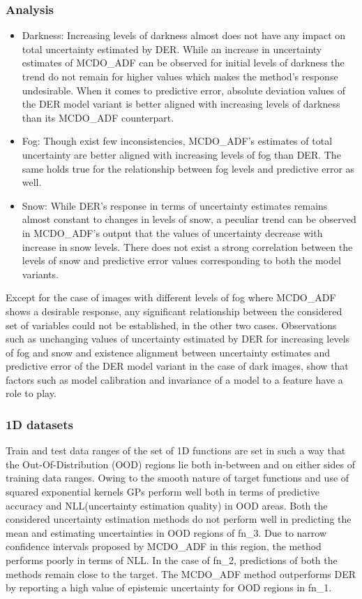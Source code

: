 \subsubsection{Analysis}
\begin{itemize}
	\item Darkness: Increasing levels of darkness almost does not have any impact on total uncertainty estimated by DER. While an increase in uncertainty estimates of MCDO\_ADF can be observed for initial levels of darkness the trend do not remain for higher values which makes the method's response undesirable. When it comes to predictive error, absolute deviation values of the DER model variant is better aligned with increasing levels of darkness than its MCDO\_ADF counterpart. 
	\item Fog: Though exist few inconsistencies, MCDO\_ADF's estimates of total uncertainty are better aligned with increasing levels of fog than DER. The same holds true for the relationship between fog levels and predictive error as well.
	\item Snow: While DER's response in terms of uncertainty estimates remains almost constant to changes in levels of snow, a peculiar trend can be observed in MCDO\_ADF's output that the values of uncertainty decrease with increase in snow levels. There does not exist a strong correlation between the levels of snow and predictive error values corresponding to both the model variants. 
\end{itemize}
Except for the case of images with different levels of fog where MCDO\_ADF shows a desirable response, any significant relationship between the considered set of variables could not be established, in the other two cases. Observations such as unchanging values of uncertainty estimated by DER for increasing levels of fog and snow and existence alignment between uncertainty estimates and predictive error of the DER model variant in the case of dark images, show that factors such as model calibration and invariance of a model to a feature have a role to play. 
\subsubsection{1D datasets}
Train and test data ranges of the set of 1D functions are set in such a way that the Out-Of-Distribution (OOD) regions lie both in-between and on either sides of training data ranges. Owing to the smooth nature of target functions and use of squared exponential kernels GPs perform well both in terms of predictive accuracy and NLL(uncertainty estimation quality) in OOD areas. Both the considered uncertainty estimation methods do not perform well in predicting the mean and estimating uncertainties in OOD regions of fn\_3. Due to narrow confidence intervals proposed by MCDO\_ADF in this region, the method performs poorly in terms of NLL. In the case of fn\_2, predictions of both the methods remain close to the target. The MCDO\_ADF method outperforms DER by reporting a high value of epistemic uncertainty for OOD regions in fn\_1. 

